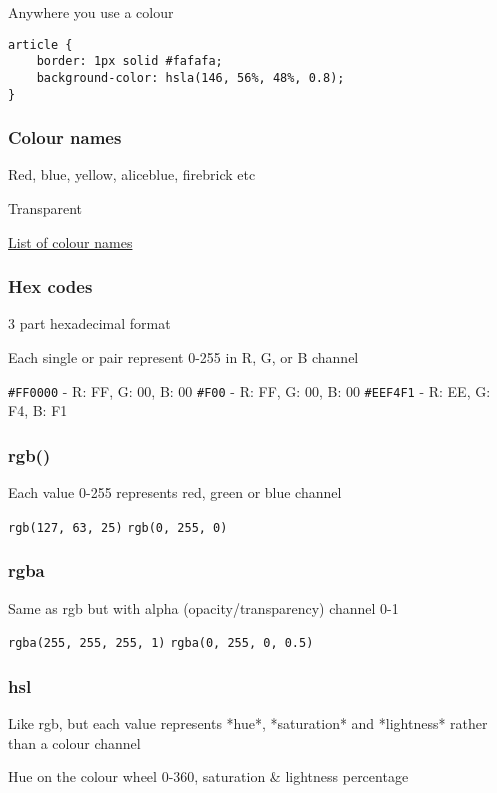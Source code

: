 Anywhere you use a colour

\begin{verbatim}
article {
    border: 1px solid #fafafa;
    background-color: hsla(146, 56%, 48%, 0.8);
}
\end{verbatim}

\subsubsection{Colour names}

Red, blue, yellow, aliceblue, firebrick etc

Transparent

\href{https://en.wikipedia.org/wiki/X11_color_names}{List of colour names}


\subsubsection{Hex codes}

3 part hexadecimal format

Each single or pair represent 0-255 in R, G, or B channel

\texttt{\#FF0000} - R: FF, G: 00, B: 00
\texttt{\#F00} - R: FF, G: 00, B: 00
\texttt{\#EEF4F1} - R: EE, G: F4, B: F1

\subsubsection{rgb()}

Each value 0-255 represents red, green or blue channel

\texttt{rgb(127, 63, 25)}
\texttt{rgb(0, 255, 0)}

\subsubsection{rgba}

Same as rgb but with alpha (opacity/transparency) channel 0-1

\texttt{rgba(255, 255, 255, 1)}
\texttt{rgba(0, 255, 0, 0.5)}

\subsubsection{hsl}

Like rgb, but each value represents *hue*, *saturation* and *lightness* rather than a colour channel

Hue on the colour wheel 0-360, saturation \& lightness percentage

